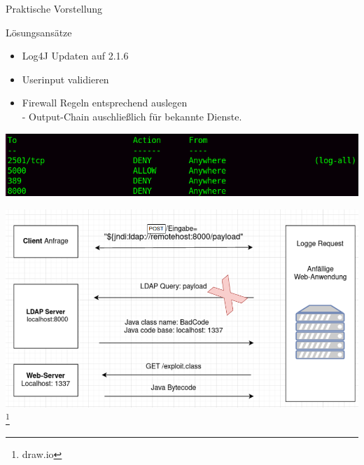 \documentclass{beamer}
\begin{document}
\begin{frame}{Praktische Vorstellung}
 
\end{frame}
\begin{frame}{Lösungsansätze}
\begin{itemize}
 \item Log4J Updaten auf 2.1.6
 \item Userinput validieren
 \item Firewall Regeln entsprechend auslegen\\
 - Output-Chain auschließlich für bekannte Dienste.
 \end{itemize}
 \begin{center}
 \includegraphics[scale=0.35]{outputchainldpa.png}
 \end{center}
 
\end{frame}
\begin{frame}
\begin{center}
\includegraphics[scale=0.35]{firewall.png}\footnote{draw.io}
\end{center}
\end{frame}
\end{document}
